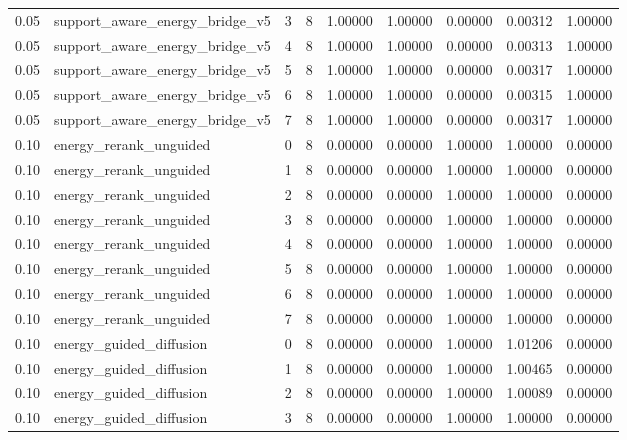 \documentclass{article}
\begin{document}
\begin{table}[tbp]
{\begin{tabular}{lllllllll}
0.05 & support\_aware\_energy\_bridge\_v5 & 3 & 8 & 1.00000 & 1.00000 & 0.00000 & 0.00312 & 1.00000 \\
0.05 & support\_aware\_energy\_bridge\_v5 & 4 & 8 & 1.00000 & 1.00000 & 0.00000 & 0.00313 & 1.00000 \\
0.05 & support\_aware\_energy\_bridge\_v5 & 5 & 8 & 1.00000 & 1.00000 & 0.00000 & 0.00317 & 1.00000 \\
0.05 & support\_aware\_energy\_bridge\_v5 & 6 & 8 & 1.00000 & 1.00000 & 0.00000 & 0.00315 & 1.00000 \\
0.05 & support\_aware\_energy\_bridge\_v5 & 7 & 8 & 1.00000 & 1.00000 & 0.00000 & 0.00317 & 1.00000 \\
0.10 & energy\_rerank\_unguided & 0 & 8 & 0.00000 & 0.00000 & 1.00000 & 1.00000 & 0.00000 \\
0.10 & energy\_rerank\_unguided & 1 & 8 & 0.00000 & 0.00000 & 1.00000 & 1.00000 & 0.00000 \\
0.10 & energy\_rerank\_unguided & 2 & 8 & 0.00000 & 0.00000 & 1.00000 & 1.00000 & 0.00000 \\
0.10 & energy\_rerank\_unguided & 3 & 8 & 0.00000 & 0.00000 & 1.00000 & 1.00000 & 0.00000 \\
0.10 & energy\_rerank\_unguided & 4 & 8 & 0.00000 & 0.00000 & 1.00000 & 1.00000 & 0.00000 \\
0.10 & energy\_rerank\_unguided & 5 & 8 & 0.00000 & 0.00000 & 1.00000 & 1.00000 & 0.00000 \\
0.10 & energy\_rerank\_unguided & 6 & 8 & 0.00000 & 0.00000 & 1.00000 & 1.00000 & 0.00000 \\
0.10 & energy\_rerank\_unguided & 7 & 8 & 0.00000 & 0.00000 & 1.00000 & 1.00000 & 0.00000 \\
0.10 & energy\_guided\_diffusion & 0 & 8 & 0.00000 & 0.00000 & 1.00000 & 1.01206 & 0.00000 \\
0.10 & energy\_guided\_diffusion & 1 & 8 & 0.00000 & 0.00000 & 1.00000 & 1.00465 & 0.00000 \\
0.10 & energy\_guided\_diffusion & 2 & 8 & 0.00000 & 0.00000 & 1.00000 & 1.00089 & 0.00000 \\
0.10 & energy\_guided\_diffusion & 3 & 8 & 0.00000 & 0.00000 & 1.00000 & 1.00000 & 0.00000 \\
\bottomrule
\end{tabular}
}
\end{table}

\clearpage
\end{document}
